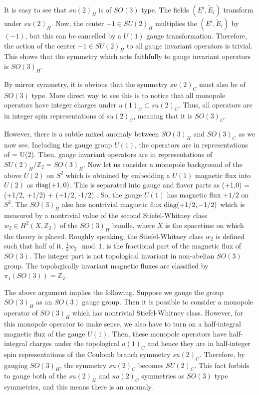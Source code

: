 \documentclass[a4paper,11pt]{article}
\def\diag{\mathop{\rm diag}\nolimits}
\def\BZ{{\mathbb Z}}
\def\beq#1\eeq{\begin{align}#1\end{align}}
\begin{document}
It is easy to see that $su(2)_H$ is of $SO(3)$ type. The fields $(E^i, \tilde{E}_i)$ transform under $su(2)_H$. Now, the center $-1 \in SU(2)_H$ multiplies
the $(E^i, \tilde{E}_i)$ by $(-1)$, but this can be cancelled by a $U(1)$ gauge transformation. Therefore, the action of the center $-1 \in SU(2)_H$ to all gauge invariant operators is trivial.
This shows that the symmetry which acts faithfully to gauge invariant operators is $SO(3)_H$.

By mirror symmetry, it is obvious that the symmetry $su(2)_C$ must also be of $SO(3)$ type. 
More direct way to see this is to notice that all monopole operators have integer charges under $u(1)_C \subset su(2)_C$. Thus, all operators are in integer spin representations of $su(2)_C$,
meaning that it is $SO(3)_C$.

However, there is a subtle mixed anomaly between $SO(3)_H$ and $SO(3)_C$ as we now see. Including the gauge group $U(1)$, the operators are in representations of
\beq
\frac{U(1) \times SU(2)_H}{\BZ_2} = U(2).
\eeq
Then, gauge invariant operators are in representations of $SU(2)_H/\BZ_2 = SO(3)_H$. Now let us consider a monopole background of the above $U(2)$ on $S^2$
which is obtained by embedding a $U(1)$ magnetic flux into $U(2)$ as $\diag(+1,0)$.
This is separated into gauge and flavor parts as
\beq
\diag(+1,0) = \diag(+1/2, +1/2) + \diag(+1/2, -1/2) .
\eeq
So, the gauge $U(1)$ has magnetic flux $+1/2$ on $S^2$. The $SO(3)_H$ also has nontrivial magnetic flux $ \diag(+1/2, -1/2) $ which is measured by a nontrivial value
of the second Stiefel-Whitney class $w_2 \in H^2(X, \BZ_2)$ of the $SO(3)_H$ bundle, where $X$ is the spacetime on which the theory is placed. 
Roughly speaking, the Stiefel-Whitney class $w_2$ is defined such that half of it, $\frac{1}{2}w_2 \mod 1$, is
the fractional part of the magnetic flux of $SO(3)$. 
The integer part is not topological invariant in non-abelian $SO(3)$ group. The topologically invariant magnetic fluxes are classified by $\pi_1(SO(3))=\BZ_2$.

The above argument implies the following. Suppose we gauge the group $SO(3)_H$ as an $SO(3)$ gauge group.
Then it is possible to consider a monopole operator of $SO(3)_H$ which has nontrivial Stiefel-Whitney class. However, for this monopole operator to make sense,
we also have to turn on a half-integral magnetic flux of the gauge $U(1)$. Then, these monopole operators have half-integral charges under the topological $u(1)_C$ 
and hence they are in half-integer spin representations of the Coulomb branch symmetry $su(2)_C$. Therefore, by gauging $SO(3)_H$, the symmetry $su(2)_C$ becomes $SU(2)_C$.
This fact forbids to gauge both of the $su(2)_H$ and $su(2)_C$ symmetries as $SO(3)$ type symmetries, and this means there is an anomaly.
\end{document}

